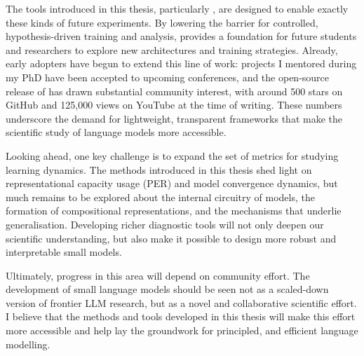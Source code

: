 The tools introduced in this thesis, particularly \pico, are designed to enable exactly these kinds of future experiments. By lowering the barrier for controlled, hypothesis-driven training and analysis, \pico provides a foundation for future students and researchers to explore new architectures and training strategies. Already, early adopters have begun to extend this line of work: projects I mentored during my PhD have been accepted to upcoming conferences, and the open-source release of \pico has drawn substantial community interest, with around 500 stars on GitHub and 125,000 views on YouTube at the time of writing. These numbers underscore the demand for lightweight, transparent frameworks that make the scientific study of language models more accessible.

Looking ahead, one key challenge is to expand the set of metrics for studying learning dynamics. The methods introduced in this thesis shed light on representational capacity usage (PER) and model convergence dynamics, but much remains to be explored about the internal circuitry of models, the formation of compositional representations, and the mechanisms that underlie generalisation. Developing richer diagnostic tools will not only deepen our scientific understanding, but also make it possible to design more robust and interpretable small models.

Ultimately, progress in this area will depend on community effort. The development of small language models should be seen not as a scaled-down version of frontier LLM research, but as a novel and collaborative scientific effort. I believe that the methods and tools developed in this thesis will make this effort more accessible and help lay the groundwork for principled, and efficient language modelling.